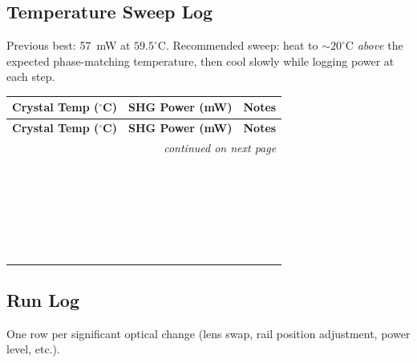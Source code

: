\documentclass[11pt, letterpaper]{article}
\begin{document}
\subsection*{Temperature Sweep Log}
\noindent
Previous best: 57~mW at $59.5^{\circ}$C.
Recommended sweep: heat to $\sim\!20^{\circ}$C \emph{above} the expected phase-matching
temperature, then cool slowly while logging power at each step.\\[6pt]

\renewcommand{\arraystretch}{1.5}
\begin{longtable}{@{}p{4.5cm}p{4.5cm}p{5cm}@{}}
\toprule
\textbf{Crystal Temp ($^{\circ}$C)} & \textbf{SHG Power (mW)} & \textbf{Notes} \\
\midrule
\endfirsthead
\toprule
\textbf{Crystal Temp ($^{\circ}$C)} & \textbf{SHG Power (mW)} & \textbf{Notes} \\
\midrule
\endhead
\midrule
\multicolumn{3}{r}{\small\itshape continued on next page}\\
\endfoot
\bottomrule
\endlastfoot
& & \\[4pt]
& & \\[4pt]
& & \\[4pt]
& & \\[4pt]
& & \\[4pt]
& & \\[4pt]
& & \\[4pt]
& & \\[4pt]
& & \\[4pt]
& & \\[4pt]
& & \\[4pt]
& & \\[4pt]
& & \\[4pt]
& & \\[4pt]
& & \\[4pt]
& & \\[4pt]
& & \\[4pt]
& & \\[4pt]
& & \\[4pt]
& & \\[4pt]
& & \\[4pt]
& & \\[4pt]
& & \\[4pt]
& & \\[4pt]
& & \\[4pt]
\end{longtable}
\renewcommand{\arraystretch}{1}

\subsection*{Run Log}
\noindent One row per significant optical change (lens swap, rail position adjustment, power level, etc.).\\[6pt]
\end{document}
